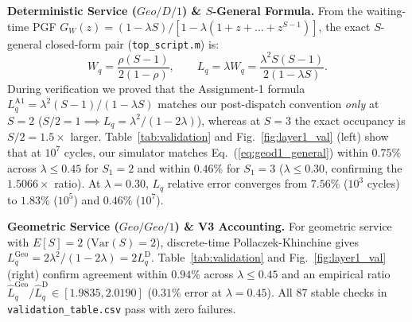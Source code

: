 \documentclass[conference]{IEEEtran}
\begin{document}
\textbf{Deterministic Service ($Geo/D/1$) \& $S$-General Formula.}
From the waiting-time PGF $G_W(z) = (1 - \lambda S)/[1 - \lambda(1 + z + \dots + z^{S-1})]$, the exact $S$-general closed-form pair (\texttt{top\_script.m}) is:
\begin{equation}
W_q = \frac{\rho(S - 1)}{2(1 - \rho)}, \qquad L_q = \lambda W_q = \frac{\lambda^2 S(S - 1)}{2(1 - \lambda S)}.
\label{eq:geod1_general}
\end{equation}
During verification we proved that the Assignment-1 formula $L_q^{\text{A1}} = \lambda^2(S - 1)/(1 - \lambda S)$ matches our post-dispatch convention \emph{only} at $S{=}2$ ($S/2{=}1 \implies L_q = \lambda^2/(1 - 2\lambda)$), whereas at $S{=}3$ the exact occupancy is $S/2 = 1.5\times$ larger. Table~\ref{tab:validation} and Fig.~\ref{fig:layer1_val} (left) show that at $10^7$ cycles, our simulator matches Eq.~(\ref{eq:geod1_general}) within $0.75\%$ across $\lambda \le 0.45$ for $S_1{=}2$ and within $0.46\%$ for $S_1{=}3$ ($\lambda \le 0.30$, confirming the $1.5066\times$ ratio). At $\lambda{=}0.30$, $L_q$ relative error converges from $7.56\%$ ($10^3$ cycles) to $1.83\%$ ($10^5$) and $0.46\%$ ($10^7$).

\textbf{Geometric Service ($Geo/Geo/1$) \& V3 Accounting.}
For geometric service with $E[S]{=}2$ ($\text{Var}(S){=}2$), discrete-time Pollaczek-Khinchine gives $L_q^{\text{Geo}} = 2\lambda^2/(1 - 2\lambda) = 2L_q^{\text{D}}$. Table~\ref{tab:validation} and Fig.~\ref{fig:layer1_val} (right) confirm agreement within $0.94\%$ across $\lambda \le 0.45$ and an empirical ratio $\hat{L}_q^{\text{Geo}}/\hat{L}_q^{\text{D}} \in [1.9835, 2.0190]$ ($0.31\%$ error at $\lambda{=}0.45$). All 87 stable checks in \texttt{validation\_table.csv} pass with zero failures.
\end{document}
